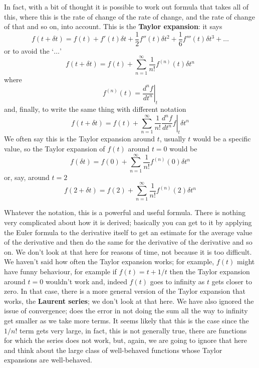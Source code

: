 \documentclass[12pt]{article}
\begin{document}
In fact, with a bit of thought it is possible to work out formula that
takes all of this, where this is the rate of change of the rate of change, and the rate of change of that and so on, into account. This is the \textbf{Taylor expansion}: it says
\begin{equation}
  f(t+\delta t)=f(t)+f'(t)\delta t+\frac{1}{2}f''(t)\delta t^2+\frac{1}{6}f'''(t)\delta t^3+\ldots
\end{equation}
or to avoid the `$\ldots$'
\begin{equation}
  f(t+\delta t)=f(t)+\sum_{n=1}^\infty \frac{1}{n!}f^{(n)}(t)\delta t^n
\end{equation}
where
\begin{equation}
  f^{(n)}(t)=\left.\frac{d^nf}{dt^n}\right|_t
\end{equation}
and, finally, to write the same thing with different notation
\begin{equation}
  f(t+\delta t)=f(t)+\sum_{n=1}^\infty \frac{1}{n!}\left.\frac{d^nf}{dt^n}f\right|_t\delta t^n
\end{equation}
We often say this is the Taylor expansion around $t$, usually $t$ would be a specific value, so the Taylor expansion of $f(t)$ around $t=0$ would be
\begin{equation}
  f(\delta t)=f(0)+\sum_{n=1}^\infty \frac{1}{n!}f^{(n)}(0)\delta t^n
\end{equation}
or, say, around $t=2$
\begin{equation}
  f(2+\delta t)=f(2)+\sum_{n=1}^\infty \frac{1}{n!}f^{(n)}(2)\delta t^n
\end{equation}

Whatever the notation, this is a powerful and useful formula. There is
nothing very complicated about how it is derived; basically you can
get to it by applying the Euler formula to the derivative itself to
get an estimate for the average value of the derivative and then do
the same for the derivative of the derivative and so on. We don't look
at that here for reasons of time, not because it is too difficult. We
haven't said how often the Taylor expansion works; for example, $f(t)$ might have funny
behaviour, for example if $f(t)=t+1/t$ then the Taylor expansion
around $t=0$ wouldn't work and, indeed $f(t)$ goes to infinity as $t$
gets closer to zero. In that case, there is a more general version of
the Taylor expansion that works, the \textbf{Laurent series}; we don't
look at that here. We have also ignored the issue of convergence; does
the error in not doing the sum all the way to infinity get smaller as
we take more terms. It seems likely that this is the case since the
$1/n!$ term gets very large, in fact, this is not generally true,
there are functions for which the series does not work, but, again, we
are going to ignore that here and think about the large class of
well-behaved functions whose Taylor expansions are well-behaved.
\end{document}
